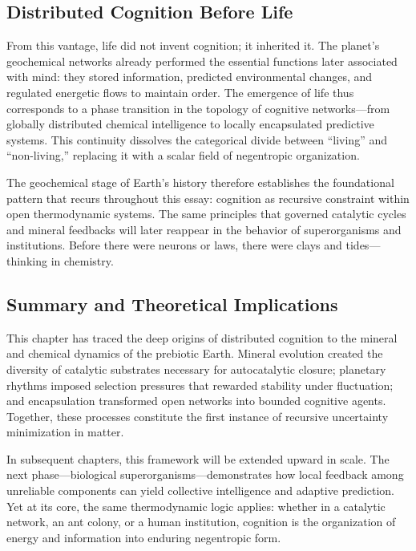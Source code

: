 \documentclass[11pt,a4paper]{article}
\begin{document}
\subsection{Distributed Cognition Before Life}

From this vantage, life did not invent cognition; it inherited it.  The planet’s geochemical networks already performed the essential functions later associated with mind: they stored information, predicted environmental changes, and regulated energetic flows to maintain order.  The emergence of life thus corresponds to a phase transition in the topology of cognitive networks—from globally distributed chemical intelligence to locally encapsulated predictive systems.  This continuity dissolves the categorical divide between “living” and “non-living,” replacing it with a scalar field of negentropic organization.

The geochemical stage of Earth’s history therefore establishes the foundational pattern that recurs throughout this essay: cognition as recursive constraint within open thermodynamic systems.  The same principles that governed catalytic cycles and mineral feedbacks will later reappear in the behavior of superorganisms and institutions.  Before there were neurons or laws, there were clays and tides—thinking in chemistry.

\subsection{Summary and Theoretical Implications}

This chapter has traced the deep origins of distributed cognition to the mineral and chemical dynamics of the prebiotic Earth.  Mineral evolution created the diversity of catalytic substrates necessary for autocatalytic closure; planetary rhythms imposed selection pressures that rewarded stability under fluctuation; and encapsulation transformed open networks into bounded cognitive agents.  Together, these processes constitute the first instance of recursive uncertainty minimization in matter.

In subsequent chapters, this framework will be extended upward in scale.  The next phase—biological superorganisms—demonstrates how local feedback among unreliable components can yield collective intelligence and adaptive prediction.  Yet at its core, the same thermodynamic logic applies: whether in a catalytic network, an ant colony, or a human institution, cognition is the organization of energy and information into enduring negentropic form.
\end{document}
